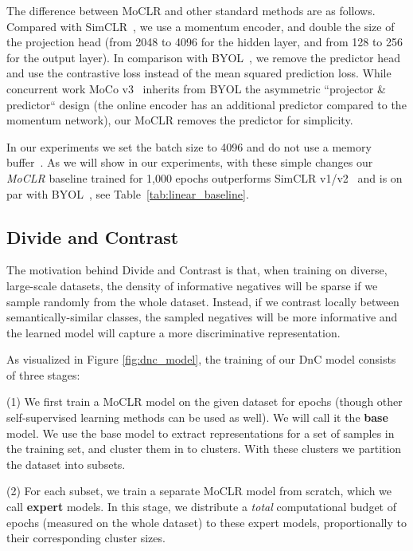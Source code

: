 \documentclass[final]{cvpr}
\newcommand\baseline{MoCLR}
\begin{document}
The difference between \baseline{} and other standard methods are as follows. Compared with SimCLR~\cite{chen2020simple}, we use a momentum encoder, and double the size of the projection head (from 2048 to 4096 for the hidden layer, and from 128 to 256 for the output layer). In comparison with BYOL~\cite{grill2020bootstrap}, we remove the predictor head and use the contrastive loss instead of the mean squared prediction loss. While concurrent work MoCo v3~\cite{chen2021empirical} inherits from BYOL the asymmetric ``projector \& predictor`` design (the online encoder has an additional predictor compared to the momentum network), our MoCLR removes the predictor for simplicity.

In our experiments we set the batch size to 4096 and do not use a memory buffer~\cite{wu2018unsupervised,tian2019contrastive,he2020momentum}. As we will show in our experiments, with these simple changes our \emph{\baseline{}} baseline trained for 1,000 epochs outperforms SimCLR v1/v2~\cite{chen2020big} and is on par with BYOL~\cite{grill2020bootstrap}, see Table~\ref{tab:linear_baseline}. 







\subsection{Divide and Contrast}




The motivation behind Divide and Contrast is that, when training on diverse, large-scale datasets, the density of informative negatives will be sparse if we sample randomly from the whole dataset. Instead, if we contrast locally between semantically-similar classes, the sampled negatives will be more informative and the learned model will capture a more discriminative representation.

As visualized in Figure \ref{fig:dnc_model}, the training of our DnC model consists of three stages:

(1) We first train a \baseline{} model on the given dataset for  epochs (though other self-supervised learning methods can be used as well). We will call it the \textbf{base} model. We use the base model to extract representations for a set of samples in the training set, and cluster them in to  clusters. With these clusters we partition the dataset into  subsets. 

(2) For each subset, we train a separate \baseline{} model from scratch, which we call \textbf{expert} models. In this stage, we distribute a \emph{total} computational budget of  epochs (measured on the whole dataset) to these expert models, proportionally to their corresponding cluster sizes.
\end{document}
